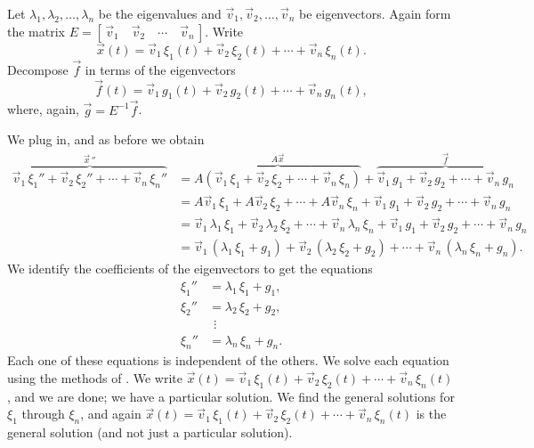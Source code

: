 \documentclass[12pt]{book}
\begin{document}
Let $\lambda_1, \lambda_2, \ldots, \lambda_n$ be the eigenvalues
and $\vec{v}_1, \vec{v}_2, \ldots, \vec{v}_n$ be eigenvectors.
Again form the matrix %
$E = [\, \vec{v}_1 \quad \vec{v}_2 \quad \cdots \quad \vec{v}_n \,]$.
Write
\begin{equation*}
\vec{x}(t) =
\vec{v}_1 \, \xi_1(t) + 
\vec{v}_2 \, \xi_2(t) + \cdots +
\vec{v}_n \, \xi_n(t) .
\end{equation*}
Decompose $\vec{f}$ in terms of the eigenvectors
\begin{equation*}
\vec{f}(t) =
\vec{v}_1 \, g_1(t) + 
\vec{v}_2 \, g_2(t) + \cdots +
\vec{v}_n \, g_n(t) ,
\end{equation*}
where, again, $\vec{g} = E^{-1} \vec{f}$.

We plug in, and as before we obtain
\begin{equation*}
\begin{split}
\overbrace{
\vec{v}_1 \, \xi_1'' + 
\vec{v}_2 \, \xi_2'' + \cdots +
\vec{v}_n \, \xi_n''
}^{{\vec{x}\,}''}
& =
\overbrace{
A \left( \vec{v}_1 \, \xi_1 + 
\vec{v}_2 \, \xi_2 + \cdots +
\vec{v}_n \, \xi_n \right)
}^{A\vec{x}}
+
\overbrace{
\vec{v}_1 \, g_1 + 
\vec{v}_2 \, g_2 + \cdots +
\vec{v}_n \, g_n
}^{\vec{f}}
\\
& = 
A \vec{v}_1 \, \xi_1 + 
A \vec{v}_2 \, \xi_2 + \cdots +
A \vec{v}_n \, \xi_n
+
\vec{v}_1 \, g_1 + 
\vec{v}_2 \, g_2 + \cdots +
\vec{v}_n \, g_n
\\
& =
\vec{v}_1 \, \lambda_1 \, \xi_1 + 
\vec{v}_2 \, \lambda_2 \, \xi_2 + \cdots +
\vec{v}_n \, \lambda_n \, \xi_n
+
\vec{v}_1 \, g_1 + 
\vec{v}_2 \, g_2 + \cdots +
\vec{v}_n \, g_n
\\
& =
\vec{v}_1 \, ( \lambda_1 \, \xi_1 + g_1 ) +
\vec{v}_2 \, ( \lambda_2 \, \xi_2 + g_2 ) + \cdots + 
\vec{v}_n \, ( \lambda_n \, \xi_n + g_n ) .
\end{split}
\end{equation*}
We identify the coefficients of the eigenvectors to get the equations
\begin{align*}
\xi_1'' & = \lambda_1 \, \xi_1 + g_1 , \\
\xi_2'' & = \lambda_2 \, \xi_2 + g_2 , \\
& ~~ \vdots \\
\xi_n'' & = \lambda_n \, \xi_n + g_n .
\end{align*}
Each one of these equations is independent of the others.
We solve each equation using the methods of .
We write
$\vec{x}(t) =
\vec{v}_1 \, \xi_1(t) +
\vec{v}_2 \, \xi_2(t) + \cdots +
\vec{v}_n \, \xi_n(t)$, and we are done; we have a particular solution.
We find the general solutions for $\xi_1$ through $\xi_n$, and
again
$\vec{x}(t) =
\vec{v}_1 \, \xi_1(t) + \vec{v}_2 \, \xi_2(t) + \cdots +
\vec{v}_n \, \xi_n(t)$ is the general solution (and not just a particular
solution).
\end{document}
